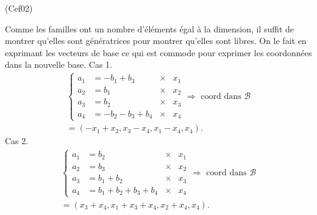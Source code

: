 \begin{tiny}(Cef02)\end{tiny} Comme les familles ont un nombre d'éléments égal à la dimension, il suffit de montrer qu'elles sont génératrices pour montrer qu'elles sont libres. On le fait en exprimant les vecteurs de base ce qui est commode pour exprimer les coordonnées dans la nouvelle base.\newline
Cas 1.
\begin{multline*}
  \left\lbrace
  \begin{aligned}
    a_1 &= -b_1 + b_3 &\times& x_1\\
    a_2 &= b_1  &\times& x_2\\
    a_3 &= b_2 &\times& x_3\\
    a_4 &= -b_2 - b_3 + b_4 &\times& x_4
  \end{aligned}
\right.
\Rightarrow \text{ coord dans } \mathcal{B}\\
= (-x_1 + x_2, x_3 - x_4, x_1 - x_4, x_4).
\end{multline*}
Cas 2.
\begin{multline*}
  \left\lbrace
  \begin{aligned}
    a_1 &= b_2 &\times& x_1\\
    a_2 &= b_3  &\times& x_2\\
    a_3 &= b_1 + b_2 &\times& x_3\\
    a_4 &= b_1 + b_2 + b_3 + b_4 &\times& x_4
  \end{aligned}
\right.
\Rightarrow \text{ coord dans } \mathcal{B}\\
= (x_3 + x_4, x_1 + x_3 + x_4, x_2 + x_4, x_4).
\end{multline*}
